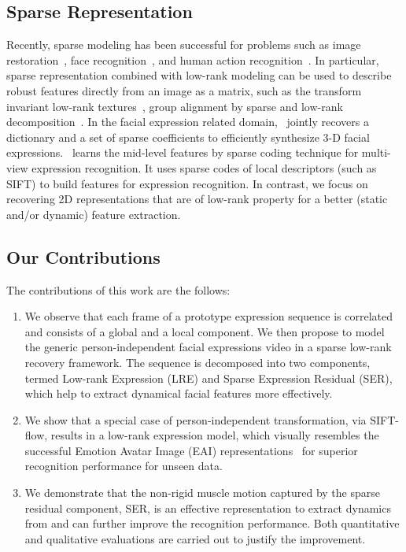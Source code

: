 \documentclass[journal]{IEEEtran}
\begin{document}
\subsection{Sparse Representation}

Recently, sparse modeling has been successful for problems such as image restoration~\cite{Yang_CVPR08}, face recognition~\cite{Wright_PAMI09}, and human action recognition~\cite{Qiu_ICCV11}. In particular, sparse representation combined with low-rank modeling can be used to describe robust features directly from an image as a matrix, such as the transform invariant low-rank textures~\cite{Zhang_IJCV12}, group alignment by sparse and low-rank decomposition~\cite{Peng_PAMI12}. In the facial expression related domain,~\cite{Lin12} jointly recovers a dictionary and a set of sparse coefficients to efficiently synthesize 3-D facial expressions.~\cite{Tariq12} learns the mid-level features by sparse coding technique for multi-view expression recognition. It uses sparse codes of local descriptors (such as SIFT) to build features for expression recognition. In contrast, we focus on recovering 2D representations that are of low-rank property for a better (static and/or dynamic) feature extraction. 

\subsection{Our Contributions}
The contributions of this work are the follows:
\begin{enumerate}
\item We observe that each frame of a prototype expression sequence is correlated and consists of a global and a local component. We then propose to model the generic person-independent facial expressions video in a sparse low-rank recovery framework. The sequence is decomposed into two components, termed Low-rank Expression (LRE) and Sparse Expression Residual (SER), which help to extract dynamical facial features more effectively. 

\item We show that a special case of person-independent transformation, via SIFT-flow, results in a low-rank expression model, which visually resembles the successful Emotion Avatar Image (EAI) representations~\cite{Yang_SMCB12} for superior recognition performance for unseen data.

\item We demonstrate that the non-rigid muscle motion captured by the sparse residual component, SER, is an effective representation to extract dynamics from and can further improve the recognition performance. Both quantitative and qualitative evaluations are carried out to justify the improvement. 

\end{enumerate}
\end{document}
